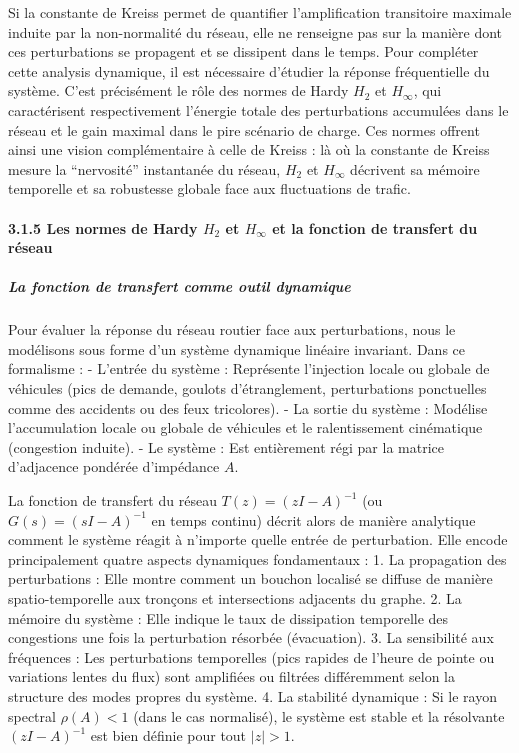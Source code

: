 \documentclass[10pt, a4paper]{article}
\begin{document}
Si la constante de Kreiss permet de quantifier l'amplification
transitoire maximale induite par la non-normalité du réseau, elle ne
renseigne pas sur la manière dont ces perturbations se propagent et se
dissipent dans le temps. Pour compléter cette analysis dynamique, il est
nécessaire d'étudier la réponse fréquentielle du système. C'est
précisément le rôle des normes de Hardy \(H_2\) et \(H_\infty\), qui
caractérisent respectivement l'énergie totale des perturbations
accumulées dans le réseau et le gain maximal dans le pire scénario de
charge. Ces normes offrent ainsi une vision complémentaire à celle de
Kreiss : là où la constante de Kreiss mesure la ``nervosité''
instantanée du réseau, \(H_2\) et \(H_\infty\) décrivent sa mémoire
temporelle et sa robustesse globale face aux fluctuations de trafic.

\paragraph{\texorpdfstring{3.1.5 Les normes de Hardy \(H_2\) et
\(H_\infty\) et la fonction de transfert du
réseau}{3.1.5 Les normes de Hardy H\_2 et H\_\textbackslash infty et la fonction de transfert du réseau}}\label{les-normes-de-hardy-h_2-et-h_infty-et-la-fonction-de-transfert-du-ruxe9seau}

\subparagraph{La fonction de transfert comme outil
dynamique}\label{la-fonction-de-transfert-comme-outil-dynamique}

Pour évaluer la réponse du réseau routier face aux perturbations, nous
le modélisons sous forme d'un système dynamique linéaire invariant. Dans
ce formalisme : - L'entrée du système : Représente l'injection locale ou
globale de véhicules (pics de demande, goulots d'étranglement,
perturbations ponctuelles comme des accidents ou des feux tricolores). -
La sortie du système : Modélise l'accumulation locale ou globale de
véhicules et le ralentissement cinématique (congestion induite). - Le
système : Est entièrement régi par la matrice d'adjacence pondérée
d'impédance \(A\).

La fonction de transfert du réseau \(T(z) = (zI - A)^{-1}\) (ou
\(G(s) = (sI - A)^{-1}\) en temps continu) décrit alors de manière
analytique comment le système réagit à n'importe quelle entrée de
perturbation. Elle encode principalement quatre aspects dynamiques
fondamentaux : 1. La propagation des perturbations : Elle montre comment
un bouchon localisé se diffuse de manière spatio-temporelle aux tronçons
et intersections adjacents du graphe. 2. La mémoire du système : Elle
indique le taux de dissipation temporelle des congestions une fois la
perturbation résorbée (évacuation). 3. La sensibilité aux fréquences :
Les perturbations temporelles (pics rapides de l'heure de pointe ou
variations lentes du flux) sont amplifiées ou filtrées différemment
selon la structure des modes propres du système. 4. La stabilité
dynamique : Si le rayon spectral \(\rho(A) < 1\) (dans le cas
normalisé), le système est stable et la résolvante \((zI - A)^{-1}\) est
bien définie pour tout \(|z| > 1\).
\end{document}

